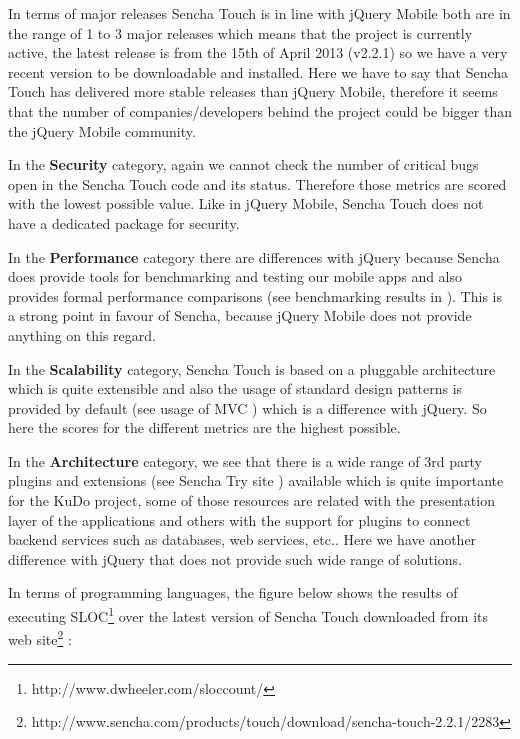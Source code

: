 \documentclass[a4paper,12pt]{book}
\begin{document}
In terms of major releases Sencha Touch is in line with jQuery Mobile both are in the range of 1 to 3 major releases which means that the project is currently active, the latest release is from the 15th of April 2013 (v2.2.1) so we have a very recent version to be downloadable and installed. Here we have to say that Sencha Touch has delivered more stable releases than jQuery Mobile, therefore it seems that the number of companies/developers behind the project could be bigger than the jQuery Mobile community.

In the \textbf{Security} category, again we cannot check the number of critical bugs open in the Sencha Touch code and its status. Therefore those metrics are scored with the lowest possible value. Like in jQuery Mobile, Sencha Touch does not have a dedicated package for security.

In the \textbf{Performance} category there are differences with jQuery because Sencha does provide tools for benchmarking and testing our mobile apps and also provides formal performance comparisons (see benchmarking results in \cite{sencha performance}). This is a strong point in favour of Sencha, because jQuery Mobile does not provide anything on this regard.

In the \textbf{Scalability} category, Sencha Touch is based on a pluggable architecture which is quite extensible and also the usage of standard design patterns is  provided by default (see usage of MVC \cite{sencha MVC}) which is a difference with jQuery. So here the scores for the different metrics are the highest possible.

In the \textbf{Architecture} category, we see that there is a wide range of 3rd party plugins and extensions (see Sencha Try site \cite{sencha Try}) available which is quite importante for the KuDo project, some of those resources are related with the presentation layer of the applications and others with the support for plugins to connect backend services such as databases, web services, etc.. Here we have another difference with jQuery that does not provide such wide range of solutions.

In terms of programming languages, the figure below shows the results of executing SLOC\footnote{http://www.dwheeler.com/sloccount/} over the latest version of Sencha Touch downloaded from its web site\footnote{http://www.sencha.com/products/touch/download/sencha-touch-2.2.1/2283} :
\end{document}
